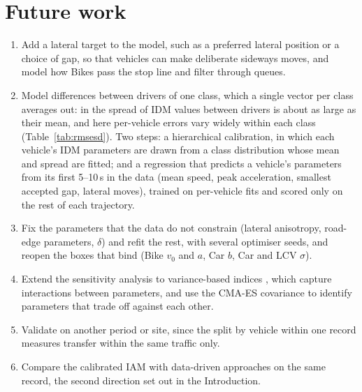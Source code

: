 \documentclass[11pt]{article}
\begin{document}
\section{Future work}
\label{sec:future}
\begin{enumerate}\setlength{\itemsep}{2pt}
\item Add a lateral target to the model, such as a preferred lateral position or
a choice of gap, so that vehicles can make deliberate sideways moves, and model
how Bikes pass the stop line and filter through queues.
\item Model differences between drivers of one class, which a single vector
per class averages out: in \cite{duggal} the spread of IDM values between
drivers is about as large as their mean, and here per-vehicle errors vary
widely within each class (Table~\ref{tab:rmsesd}). Two steps: a hierarchical
calibration, in which each vehicle's IDM parameters are drawn from a class
distribution whose mean and spread are fitted; and a regression that predicts a
vehicle's parameters from its first 5--10\,s in the data (mean speed, peak
acceleration, smallest accepted gap, lateral moves), trained on per-vehicle fits
and scored only on the rest of each trajectory.
\item Fix the parameters that the data do not constrain (lateral anisotropy,
road-edge parameters, $\delta$) and refit the rest, with several optimiser seeds,
and reopen the boxes that bind (Bike $v_0$ and $a$, Car $b$, Car and LCV $\sigma$).
\item Extend the sensitivity analysis to variance-based indices \cite{punzo},
which capture interactions between parameters, and use the CMA-ES covariance
to identify parameters that trade off against each other.
\item Validate on another period or site, since the split by vehicle within one
record measures transfer within the same traffic only.
\item Compare the calibrated IAM with data-driven approaches on the same record,
the second direction set out in the Introduction.
\end{enumerate}

\end{document}
